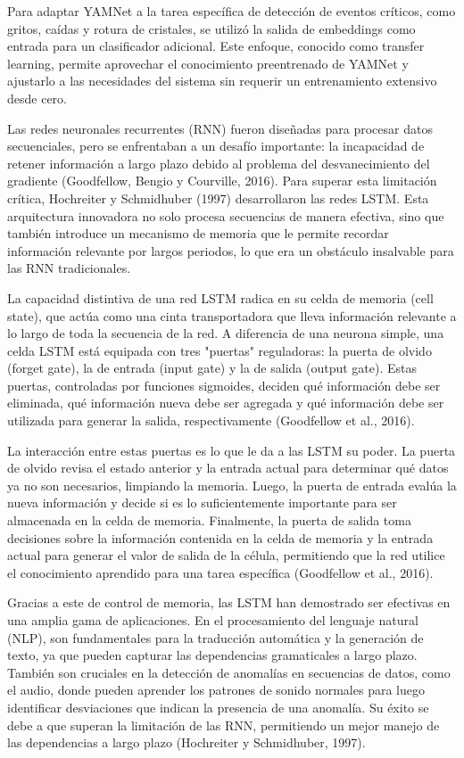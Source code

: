 Para adaptar YAMNet a la tarea específica de detección de eventos críticos, como gritos, caídas y rotura de cristales, se utilizó la salida de embeddings como entrada para un clasificador adicional. Este enfoque, conocido como transfer learning, permite aprovechar el conocimiento preentrenado de YAMNet y ajustarlo a las necesidades del sistema sin requerir un entrenamiento extensivo desde cero.


Las redes neuronales recurrentes (RNN) fueron diseñadas para procesar datos secuenciales, pero se enfrentaban a un desafío importante: la incapacidad de retener información a largo plazo debido al problema del desvanecimiento del gradiente (Goodfellow, Bengio y Courville, 2016). Para superar esta limitación crítica, Hochreiter y Schmidhuber (1997) desarrollaron las redes LSTM. Esta arquitectura innovadora no solo procesa secuencias de manera efectiva, sino que también introduce un mecanismo de memoria que le permite recordar información relevante por largos periodos, lo que era un obstáculo insalvable para las RNN tradicionales.

La capacidad distintiva de una red LSTM radica en su celda de memoria (cell state), que actúa como una cinta transportadora que lleva información relevante a lo largo de toda la secuencia de la red. A diferencia de una neurona simple, una celda LSTM está equipada con tres "puertas" reguladoras: la puerta de olvido (forget gate), la de entrada (input gate) y la de salida (output gate). Estas puertas, controladas por funciones sigmoides, deciden qué información debe ser eliminada, qué información nueva debe ser agregada y qué información debe ser utilizada para generar la salida, respectivamente (Goodfellow et al., 2016).

La interacción entre estas puertas es lo que le da a las LSTM su poder. La puerta de olvido revisa el estado anterior y la entrada actual para determinar qué datos ya no son necesarios, limpiando la memoria. Luego, la puerta de entrada evalúa la nueva información y decide si es lo suficientemente importante para ser almacenada en la celda de memoria. Finalmente, la puerta de salida toma decisiones sobre la información contenida en la celda de memoria y la entrada actual para generar el valor de salida de la célula, permitiendo que la red utilice el conocimiento aprendido para una tarea específica (Goodfellow et al., 2016).

Gracias a este de control de memoria, las LSTM han demostrado ser efectivas en una amplia gama de aplicaciones. En el procesamiento del lenguaje natural (NLP), son fundamentales para la traducción automática y la generación de texto, ya que pueden capturar las dependencias gramaticales a largo plazo. También son cruciales en la detección de anomalías en secuencias de datos, como el audio, donde pueden aprender los patrones de sonido normales para luego identificar desviaciones que indican la presencia de una anomalía. Su éxito se debe a que superan la limitación de las RNN, permitiendo un mejor manejo de las dependencias a largo plazo (Hochreiter y Schmidhuber, 1997).

